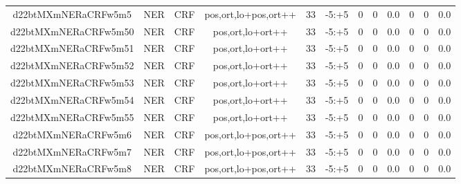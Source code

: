 \documentclass[a4paper]{article}
\begin{document}
\begin{landscape}
\begin{center}
\begin{tabular}{ |c|c|c|c|c|c|c|c|c|c|c|c|}
 
 	
 	\small{ d22btMXmNERaCRFw5m5 } & \small{ NER} & \small{  CRF }  & pos,ort,lo+pos,ort++  &  33 &  \small{  -5:+5 }  &  0 & 0 & 0.0  &  0 & 0 & 0.0 \\
 	

 
 	
 	\small{ d22btMXmNERaCRFw5m50 } & \small{ NER} & \small{  CRF }  & pos,ort,lo+ort++  &  33 &  \small{  -5:+5 }  &  0 & 0 & 0.0  &  0 & 0 & 0.0 \\
 	

 
 	
 	\small{ d22btMXmNERaCRFw5m51 } & \small{ NER} & \small{  CRF }  & pos,ort,lo+ort++  &  33 &  \small{  -5:+5 }  &  0 & 0 & 0.0  &  0 & 0 & 0.0 \\
 	

 
 	
 	\small{ d22btMXmNERaCRFw5m52 } & \small{ NER} & \small{  CRF }  & pos,ort,lo+ort++  &  33 &  \small{  -5:+5 }  &  0 & 0 & 0.0  &  0 & 0 & 0.0 \\
 	

 
 	
 	\small{ d22btMXmNERaCRFw5m53 } & \small{ NER} & \small{  CRF }  & pos,ort,lo+ort++  &  33 &  \small{  -5:+5 }  &  0 & 0 & 0.0  &  0 & 0 & 0.0 \\
 	

 
 	
 	\small{ d22btMXmNERaCRFw5m54 } & \small{ NER} & \small{  CRF }  & pos,ort,lo+ort++  &  33 &  \small{  -5:+5 }  &  0 & 0 & 0.0  &  0 & 0 & 0.0 \\
 	

 
 	
 	\small{ d22btMXmNERaCRFw5m55 } & \small{ NER} & \small{  CRF }  & pos,ort,lo+ort++  &  33 &  \small{  -5:+5 }  &  0 & 0 & 0.0  &  0 & 0 & 0.0 \\
 	

 
 	
 	\small{ d22btMXmNERaCRFw5m6 } & \small{ NER} & \small{  CRF }  & pos,ort,lo+pos,ort++  &  33 &  \small{  -5:+5 }  &  0 & 0 & 0.0  &  0 & 0 & 0.0 \\
 	

 
 	
 	\small{ d22btMXmNERaCRFw5m7 } & \small{ NER} & \small{  CRF }  & pos,ort,lo+pos,ort++  &  33 &  \small{  -5:+5 }  &  0 & 0 & 0.0  &  0 & 0 & 0.0 \\
 	

 
 	
 	\small{ d22btMXmNERaCRFw5m8 } & \small{ NER} & \small{  CRF }  & pos,ort,lo+pos,ort++  &  33 &  \small{  -5:+5 }  &  0 & 0 & 0.0  &  0 & 0 & 0.0 \\
 	


\end{tabular}
\end{center}
\end{landscape}
\end{document}
